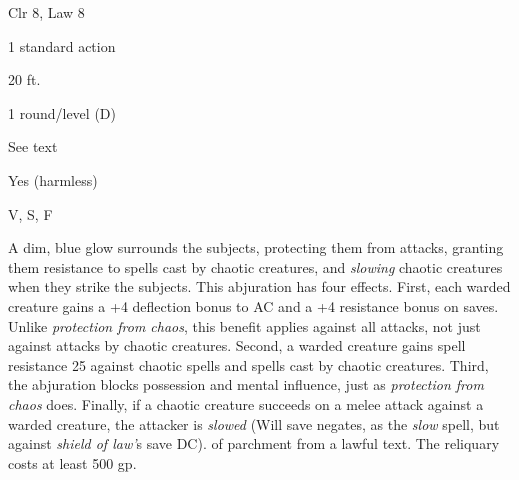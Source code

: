 
\begin{description*}
\item[Level:] Clr 8, Law 8
\item[Casting Time:] 1 standard action
\item[Range:] 20 ft.
\item[Duration:] 1 round/level (D)
\item[Saving Throw:] See text
\item[Spell Resistance:] Yes (harmless)
\item[Components:] V, S, F
\end{description*}

A dim, blue glow surrounds the subjects, protecting them from attacks, granting
them resistance to spells cast by chaotic creatures, and \textit{slowing} chaotic
creatures when they strike the subjects. This abjuration has four effects.
First, each warded creature gains a +4 deflection bonus to AC and a +4 resistance
bonus on saves. Unlike \textit{protection from chaos}, this benefit applies against
all attacks, not just against attacks by chaotic creatures.
Second, a warded creature gains spell resistance 25 against chaotic spells and
spells cast by chaotic creatures.
Third, the abjuration blocks possession and mental influence, just as \textit{protection
from chaos} does.
Finally, if a chaotic creature succeeds on a melee attack against a warded creature,
the attacker is \textit{slowed} (Will save negates, as the \textit{slow} spell,
but against \textit{shield of law'}s save DC).
of parchment from a lawful text. The reliquary costs at least 500 gp.
